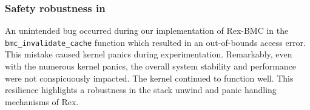 \subsubsection{Safety robustness in \projname{}}
\sloppypar
An unintended bug occurred during our implementation of Rex-BMC in the
\texttt{bmc\_invalidate\_cache} function
which resulted in an out-of-bounds access error.
This mistake caused kernel panics during experimentation.
Remarkably, even with the numerous kernel panics, the overall system stability
    and performance were not conspicuously impacted.
The kernel continued to function well.
This resilience highlights a robustness in the stack unwind and panic handling mechanisms of Rex.
